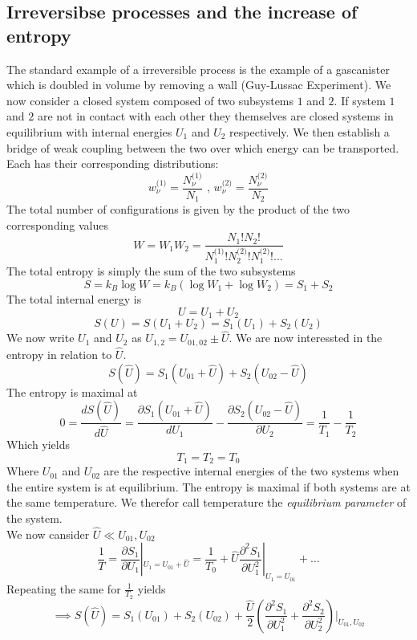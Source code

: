\documentclass{report}
\begin{document}
\subsection{Irreversibse processes and the increase of entropy}
The standard example of a irreversible process is the example of a gascanister which is doubled in volume by removing a wall (Guy-Lussac Experiment). We now consider a closed system composed of two subsystems $1$ and $2$. If system $1$ and $2$ are not in contact with each other they themselves are closed systems in equilibrium with internal energies $U_{1}$ and $U_{2}$ respectively.
We then establish a bridge of weak coupling between the two over which energy can be transported. Each has their corresponding distributions: \[
  w_\nu^\text{(1)} = \frac{N_\nu^\text{(1)}}{N_1} \text{ , } w_\nu^\text{(2)} = \frac{N_\nu^\text{(2)}}{N_2}
\] 
The total number of configurations is given by the product of the two corresponding values \[
  W = W_1 W_2 = \frac{N_1! N_2!}{N_1^\text{(1)}! N_2^\text{(2)}! N_1^\text{(2)}! \ldots}
\] 
The total entropy is simply the sum of the two subsystems \[
  S = k_B \log W = k_B \left( \log W_1 + \log W_2 \right) = S_1 + S_2
\]  
The total internal energy is \[
U = U_1 + U_2
\] \[
S\left( U \right) = S\left( U_1 + U_2 \right) = S_1\left( U_1 \right) +S_2\left( U_2 \right) 
\] 
We now write $U_1$ and $U_2$ as $U_{1,2} = U_{01,02} \pm \hat{U}$. We are now interessted in the entropy in relation to $\hat{U}$.\[
  S\left( \hat{U} \right) = S_1\left( U_{01} + \hat{U} \right) + S_2\left( U_{02} - \hat{U} \right) 
\] 
The entropy is maximal at \[
  0 = \frac{dS\left( \hat{U} \right) }{d\hat{U}} = \frac{\partial S_1\left( U_{01} + \hat{U} \right)  }{d U_1} - \frac{\partial S_2\left( U_{02} - \hat{U} \right)  }{\partial U_2 } = \frac{1}{T_1} - \frac{1}{T_2}
\] Which yields \[
T_1 = T_2 = T_0
\] 
Where $U_{01}$ and $U_{02}$ are the respective internal energies of the two systems when the entire system is at equilibrium. 
The entropy is maximal if both systems are at the same temperature. We therefor call temperature the \emph{equilibrium parameter} of the system. \\
We now cansider $\hat{U} \ll U_{01}, U_{02}$ \[
\frac{1}{T} = \frac{\partial S_1 }{\partial U_1 } |_{U_1 = U_{01} + \hat{U}} = \frac{1}{T_0} + \hat{U} \frac{\partial^2 S_1 }{\partial U_1^2 }|_{U_1 = U_{01}} + \ldots
\] Repeating the same for $\frac{1}{T_2}$ yields \[
\implies S\left( \hat{U} \right) = S_1\left( U_{01} \right) + S_2\left( U_{02} \right) + \frac{\hat{U}}{2}\left( \frac{\partial^2 S_1 }{\partial U_1^2 } + \frac{\partial^2 S_2 }{\partial U_2^2 } \right)|_{U_{01}, U_{02}}
\] 
\end{document}
